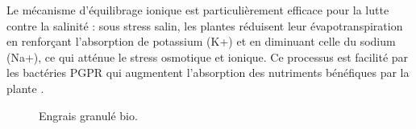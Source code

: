 Le mécanisme d’équilibrage ionique est particulièrement efficace pour la lutte contre la
salinité : sous stress salin, les plantes réduisent leur évapotranspiration en renforçant l’absorption 
de potassium (K+) et en diminuant celle du sodium (Na+), ce qui atténue le stress osmotique et ionique. 
Ce processus est facilité par les bactéries PGPR qui augmentent l’absorption des nutriments bénéfiques par la plante \cite{gao_progress_2022}.

\begin{figure}[H]
    \centering
{}
    \caption{Engrais granulé bio. }
    \label{fig:EGB2}
\end{figure}
    

    

  




 





 

